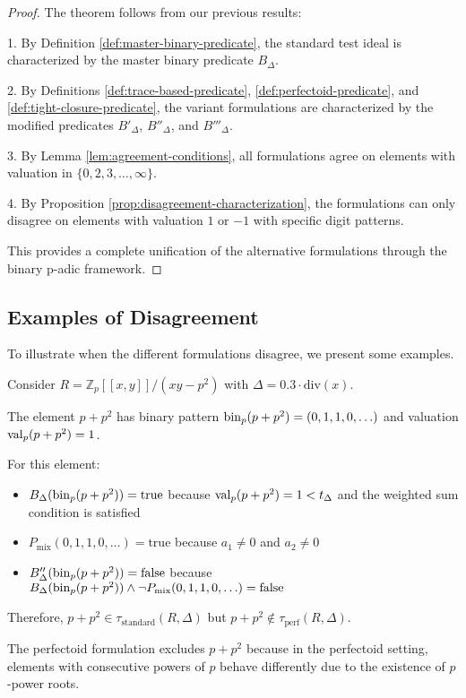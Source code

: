 \begin{proof}
The theorem follows from our previous results:

1. By Definition \ref{def:master-binary-predicate}, the standard test ideal is characterized by the master binary predicate $B_\Delta$.

2. By Definitions \ref{def:trace-based-predicate}, \ref{def:perfectoid-predicate}, and \ref{def:tight-closure-predicate}, the variant formulations are characterized by the modified predicates $B'_\Delta$, $B''_\Delta$, and $B'''_\Delta$.

3. By Lemma \ref{lem:agreement-conditions}, all formulations agree on elements with valuation in $\{0,2,3,\ldots,\infty\}$.

4. By Proposition \ref{prop:disagreement-characterization}, the formulations can only disagree on elements with valuation $1$ or $-1$ with specific digit patterns.

This provides a complete unification of the alternative formulations through the binary p-adic framework.
\end{proof}

\subsection{Examples of Disagreement}

To illustrate when the different formulations disagree, we present some examples.

\begin{example}\label{ex:perfectoid-standard}
Consider $R = \mathbb{Z}_p[[x,y]]/(xy-p^2)$ with $\Delta = 0.3 \cdot \text{div}(x)$.

The element $p + p^2$ has binary pattern $\operatorname{bin}_p(p + p^2) = (0, 1, 1, 0, \ldots)$ and valuation $\operatorname{val}_p(p + p^2) = 1$.

For this element:
\begin{itemize}
    \item $B_\Delta(\operatorname{bin}_p(p + p^2)) = \text{true}$ because $\operatorname{val}_p(p + p^2) = 1 < t_\Delta$ and the weighted sum condition is satisfied
    \item $P_{\text{mix}}(0, 1, 1, 0, \ldots) = \text{true}$ because $a_1 \neq 0$ and $a_2 \neq 0$
    \item $B''_\Delta(\operatorname{bin}_p(p + p^2)) = \text{false}$ because $B_\Delta(\operatorname{bin}_p(p + p^2)) \wedge \neg P_{\text{mix}}(0, 1, 1, 0, \ldots) = \text{false}$
\end{itemize}

Therefore, $p + p^2 \in \tau_{\text{standard}}(R,\Delta)$ but $p + p^2 \notin \tau_{\text{perf}}(R,\Delta)$.

The perfectoid formulation excludes $p + p^2$ because in the perfectoid setting, elements with consecutive powers of $p$ behave differently due to the existence of $p$-power roots.
\end{example}

